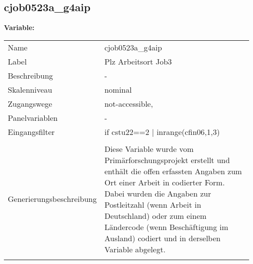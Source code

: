 	
	
	\subsection{cjob0523a\_g4aip}
	\label{subSection:cjob0523a_g4aip}

	\noindent\textbf{Variable:}\\
		\begin{tabular}{lL{11.3cm}}
			\label{tableVariable:cjob0523a_g4aip}
			Name & cjob0523a\_g4aip \\
			Label & Plz Arbeitsort Job3 \\
			Beschreibung & - \\
			Skalenniveau & nominal \\
			Zugangswege &
				not-accessible,
 \\
			Panelvariablen & -
			 \\
			Eingangsfilter & if cstu22==2 | inrange(cfin06,1,3) \\
 \\
					Generierungsbeschreibung & Diese Variable wurde vom Primärforschungsprojekt erstellt und enthält die offen erfassten Angaben zum Ort einer Arbeit in codierter Form. Dabei wurden die Angaben zur Postleitzahl (wenn Arbeit in Deutschland) oder zum einem Ländercode (wenn Beschäftigung im Ausland) codiert und in derselben Variable abgelegt.
				 \\	
			 \\
		\end{tabular}






	
	\newpage

